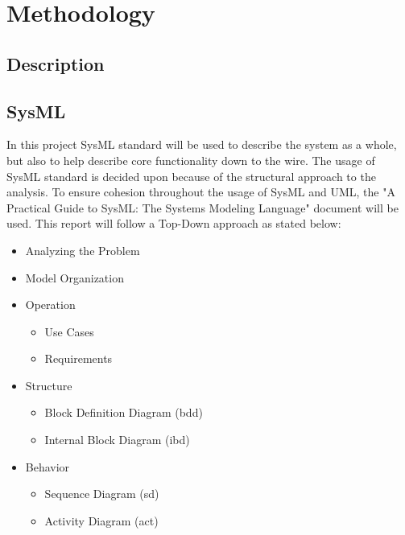 \section{Methodology}
\subsection{Description}
\noindent{}


\subsection{SysML}
In this project SysML standard will be used to describe the system as a whole, but also to help describe core functionality down to the wire. The usage of SysML standard is decided upon because of the structural approach to the analysis. To ensure cohesion throughout the usage of SysML and UML, the "A Practical Guide to SysML: The Systems Modeling Language"\cite{Friedenthal2014} document will be used. This report will follow a Top-Down approach as stated below:

\begin{itemize}
	\item Analyzing the Problem
	\item Model Organization
	\item Operation
	\begin{itemize}
		\item Use Cases
		\item Requirements
	\end{itemize}
	\item Structure
	\begin{itemize}
		\item Block Definition Diagram (bdd)
		\item Internal Block Diagram (ibd)
	\end{itemize}
	\item Behavior
	\begin{itemize}
		\item Sequence Diagram (sd)
		\item Activity Diagram (act)
	\end{itemize}
\end{itemize}


